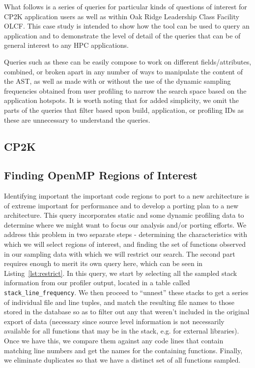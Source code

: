 What follows is a series of queries for particular kinds of questions of interest for CP2K 
application users as well as within  Oak Ridge Leadership Class Facility \acs{OLCF}.
This case study is intended to show how the tool can be used to query an application and to 
demonstrate the level of detail of the queries that can  be of general interest to any \acs{HPC} 
applications.

Queries such as these can be easily compose to work on different fields/attributes, combined, or 
broken apart in any number of ways to manipulate the content of the AST, as well as made with or 
without the use of the dynamic sampling frequencies obtained from user profiling to narrow the 
search space based on the application hotspots.
It is worth noting that for added simplicity, we omit the parts of the queries that filter based upon 
build, application, or profiling IDs as these are unnecessary to understand the queries.

\subsection{CP2K}
\label{sec:cp2k}


\subsection{Finding OpenMP Regions of Interest}
Identifying important the important code regions to port to a new architecture is of extreme important  
for performance and to develop a porting plan to a new architecture.
This query incorporates static and some dynamic profiling 
data to determine where we might want to focus our analysis and/or porting efforts.
We address this problem in two separate steps - determining the characteristics with which we will 
select regions of interest, and finding the set of functions observed in our sampling data with which 
we will restrict our search.
The second part requires enough to merit its own query here, which can be seen in 
Listing~\ref{lst:restrict}.
In this query, we start by selecting all the sampled stack information from our profiler output, located 
in a table called \texttt{stack\_line\_frequency}.
We then proceed to ``unnest'' these stacks to get a series of individual file and line tuples, and match 
the resulting file names to those stored in the database so as to filter out any that weren't included in 
the original export of data (necessary since source level information is not necessarily available for 
all functions that may be in the stack, e.g. for external libraries).
Once we have this, we compare them against any code lines that contain matching line numbers and 
get the names for the containing functions.
Finally, we eliminate duplicates so that we have a distinct set of all functions sampled.

